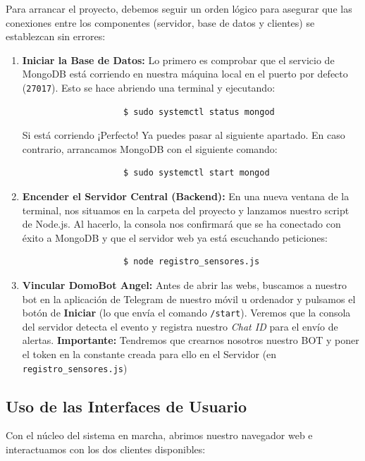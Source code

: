 \documentclass[a4paper,12pt]{article}
\begin{document}
			Para arrancar el proyecto, debemos seguir un orden lógico para asegurar que las conexiones entre los componentes (servidor, base de datos y clientes) se establezcan sin errores:
		
			\begin{enumerate}
				\item \textbf{Iniciar la Base de Datos:} Lo primero es comprobar que el servicio de MongoDB está corriendo en nuestra máquina local en el puerto por defecto (\texttt{27017}). Esto se hace abriendo una terminal y ejecutando:
				\begin{verbatim}
					$ sudo systemctl status mongod
				\end{verbatim}
				Si está corriendo ¡Perfecto! Ya puedes pasar al siguiente apartado. En caso contrario, arrancamos MongoDB con el siguiente comando: 
				\begin{verbatim}
					$ sudo systemctl start mongod
				\end{verbatim}

				\item \textbf{Encender el Servidor Central (Backend):} En una nueva ventana de la terminal, nos situamos en la carpeta del proyecto y lanzamos nuestro script de Node.js. Al hacerlo, la consola nos confirmará que se ha conectado con éxito a MongoDB y que el servidor web ya está escuchando peticiones:
				\begin{verbatim}
					$ node registro_sensores.js
				\end{verbatim}
		
				\item \textbf{Vincular DomoBot Angel:} Antes de abrir las webs, buscamos a nuestro bot en la aplicación de Telegram de nuestro móvil u ordenador y pulsamos el botón de \textbf{Iniciar} (lo que envía el comando \texttt{/start}). Veremos que la consola del servidor detecta el evento y registra nuestro \textit{Chat ID} para el envío de alertas. \textbf{Importante:} Tendremos que crearnos nosotros nuestro BOT y poner el token en la constante creada para ello en el Servidor (en \texttt{registro\_sensores.js})
			\end{enumerate}
	
		\subsection{Uso de las Interfaces de Usuario}
			Con el núcleo del sistema en marcha, abrimos nuestro navegador web e interactuamos con los dos clientes disponibles:
			
\end{document}
